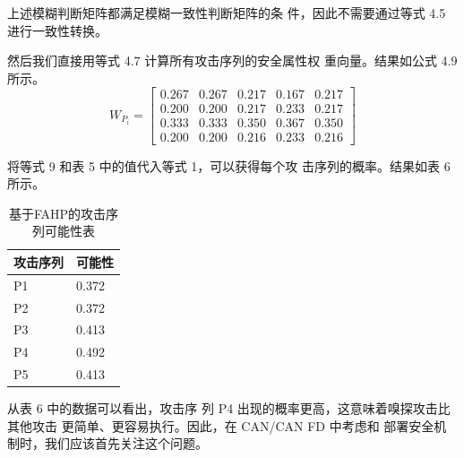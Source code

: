 上述模糊判断矩阵都满足模糊一致性判断矩阵的条
件，因此不需要通过等式 4.5 进行一致性转换。

然后我们直接用等式 4.7 计算所有攻击序列的安全属性权
重向量。结果如公式 4.9 所示。
\begin{equation}
    W_{P_i}=\left[\begin{array}{lllll}
    0.267 & 0.267 & 0.217 & 0.167 & 0.217 \\
    0.200 & 0.200 & 0.217 & 0.233 & 0.217 \\
    0.333 & 0.333 & 0.350 & 0.367 & 0.350 \\
    0.200 & 0.200 & 0.216 & 0.233 & 0.216
    \end{array}\right]
    \end{equation}

将等式 9 和表 5 中的值代入等式 1，可以获得每个攻
击序列的概率。结果如表 6 所示。
\begin{table}
  \caption{基于FAHP的攻击序列可能性表}
\begin{center}
    \begin{tabular}{|l|l}
      \hline 攻击序列 & 可能性 \\
      \hline P1 & 0.372 \\
      \hline P2 & 0.372 \\
      \hline P3 & 0.413 \\
      \hline P4 & 0.492 \\
      \hline P5 & 0.413 \\
      \end{tabular}
  \end{center}
\end{table}
从表 6 中的数据可以看出，攻击序
列 P4 出现的概率更高，这意味着嗅探攻击比其他攻击
更简单、更容易执行。因此，在 CAN/CAN FD 中考虑和
部署安全机制时，我们应该首先关注这个问题。

